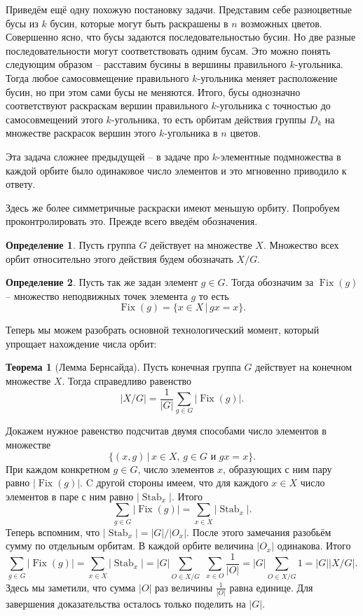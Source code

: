 \documentclass[10pt,a4paper,oneside]{book}
\theoremstyle{definition}
\newtheorem*{defn}{\color{yellow!30!red} Определение}
\newtheorem{thm}{\color{red!40!black}Теорема}
\newcommand{\Stab}{\operatorname{Stab}}
\newcommand{\Fix}{\operatorname{Fix}}
\def\thrm{\begin{thm}}
\def\ethrm{\end{thm}}
\def\dfn{\begin{defn}}
\def\edfn{\end{defn}}
\begin{document}
Приведём ещё одну похожую постановку задачи. Представим себе разноцветные бусы из $k$ бусин, которые могут быть раскрашены в $n$ возможных цветов. Совершенно ясно, что бусы задаются последовательностью бусин. Но две разные последовательности могут соответствовать одним бусам. Это можно понять следующим образом -- расставим бусины в вершины правильного $k$-угольника. Тогда любое самосовмещение правильного $k$-угольника меняет расположение бусин, но при этом сами бусы не меняются. Итого,  бусы однозначно соответствуют раскраскам вершин правильного $k$-угольника с точностью до самосовмещений этого $k$-угольника, то есть орбитам действия группы $D_k$ на множестве раскрасок вершин этого $k$-угольника в  $n$ цветов.

Эта задача сложнее предыдущей -- в задаче про $k$-элементные подмножества в каждой орбите было одинаковое число элементов и это мгновенно приводило к ответу. 

Здесь же более симметричные раскраски имеют меньшую орбиту. Попробуем проконтролировать это. Прежде всего введём обозначения.

\dfn Пусть группа $G$ действует на множестве $X$. Множество всех орбит относительно этого действия будем обозначать $X/G$.
\edfn 

\dfn Пусть так же задан элемент $g\in G$. Тогда обозначим за $\Fix(g)$ -- множество неподвижных точек элемента $g$ то есть 
$$\Fix(g)=\{x \in X\,|\, gx=x\}.$$
\edfn

Теперь мы можем разобрать основной технологический момент, который упрощает нахождение числа орбит:

\thrm[Лемма Бернсайда]
Пусть конечная группа $G$ действует на конечном множестве $X$. Тогда справедливо равенство
$$|X/G|=\frac{1}{|G|}\sum_{g\in G}|\Fix(g)|.$$
\ethrm
\proof Докажем нужное равенство подсчитав двумя способами число элементов в множестве $$\{(x,g) \,|\, x\in X,\, g\in G \text{ и } gx=x\}.$$
При каждом конкретном $g\in G$, число элементов $x$, образующих с ним пару равно $|\Fix(g)|$. C другой стороны имеем, что для каждого $x\in X$ число элементов в паре с ним равно $|\Stab_x|$. Итого $$\sum_{g\in G}|\Fix(g)|= \sum_{x\in X} |\Stab_x|.$$
Теперь вспомним, что $|\Stab_x|=|G|/|O_x|$. После этого замечания разобьём сумму по отдельным орбитам. В каждой орбите величина $|O_x|$ одинакова. Итого 
$$\sum_{g\in G}|\Fix(g)|= \sum_{x\in X} |\Stab_x|= |G|\sum_{O\in X/G}\,\, \sum_{x\in O} \frac{1}{|O|}=|G|\sum_{O\in X/G} 1=|G||X/G|.$$
Здесь мы заметили, что сумма $|O|$ раз величины $\frac{1}{|O|}$ равна единице. Для завершения доказательства осталось только поделить на $|G|$.
\endproof
\end{document}
